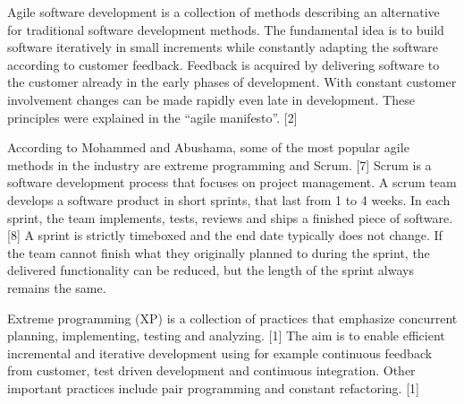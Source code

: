Agile software development is a collection of methods describing an
alternative for traditional software development methods. The fundamental
idea is to build software iteratively in small increments while
constantly adapting the software according to customer feedback.
Feedback is acquired by delivering software to the customer already in
the early phases of development. With constant customer involvement
changes can be made rapidly even late in development. These principles were
explained in the ``agile manifesto''. [2]

According to Mohammed and Abushama, some of the most popular agile
methods in the industry are extreme programming and Scrum. [7] Scrum is
a software development process that focuses on project management. A
scrum team develops a software product in short sprints, that last from
1 to 4 weeks. In each sprint, the team implements, tests, reviews and
ships a finished piece of software. [8] A sprint is strictly timeboxed
and the end date typically does not change. If the team cannot finish
what they originally planned to during the sprint, the delivered
functionality can be reduced, but the length of the sprint always
remains the same.

Extreme programming (XP) is a collection of practices that emphasize
concurrent planning, implementing, testing and analyzing. [1] The aim
is to enable efficient incremental and iterative development using for
example continuous feedback from customer, test driven development
and continuous integration. Other important practices include pair
programming and constant refactoring. [1]
